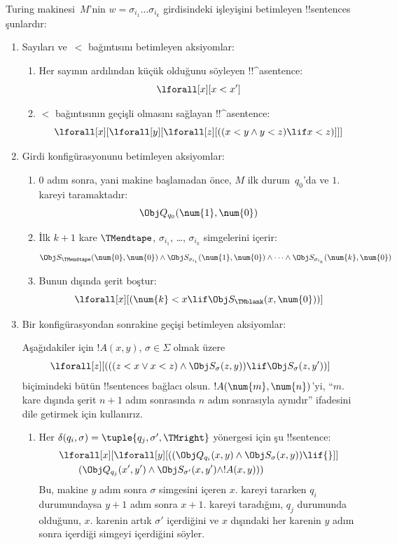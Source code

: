 \documentclass[../../../include/open-logic-section]{subfiles}
\begin{document}
Turing makinesi~$M$'nin $w=\sigma_{i_1}\dots\sigma_{i_k}$ girdisindeki
işleyişini betimleyen !!{sentence}s şunlardır:
\begin{enumerate}
\item Sayıları ve~$<$ bağıntısını betimleyen aksiyomlar:
\begin{enumerate}
\item Her sayının ardılından küçük olduğunu söyleyen !!^a{sentence}:
\[
\lforall[x][x < x']
\]
\item $<$ bağıntısının geçişli olmasını sağlayan !!^a{sentence}:
\[
\lforall[x][\lforall[y][\lforall[z][
      ((x < y \land y < z) \lif x < z)]]]
\]
\end{enumerate}
\item Girdi konfigürasyonunu betimleyen aksiyomlar:
\begin{enumerate}
\item $0$ adım sonra, yani makine başlamadan önce, $M$ ilk durum~$q_0$'da ve
  $1$. kareyi taramaktadır:
\[
\Obj Q_{q_0}(\num{1}, \num{0})
\]
\item İlk $k+1$ kare $\TMendtape$, $\sigma_{i_1}$, \dots,
  $\sigma_{i_k}$ simgelerini içerir:
\[
\Obj S_\TMendtape(\num{0}, \num{0}) \land
\Obj S_{\sigma_{i_1}}(\num{1}, \num{0}) \land
\dots \land
\Obj S_{\sigma_{i_k}}(\num{k}, \num{0})
\]
\item Bunun dışında şerit boştur:
\[
\lforall[x][(\num{k} < x \lif \Obj S_\TMblank(x, \num{0}))]
\]
\end{enumerate}
\item Bir konfigürasyondan sonrakine geçişi betimleyen aksiyomlar:

Aşağıdakiler için $!A(x,y)$, $\sigma\in\Sigma$ olmak üzere
\[
\lforall[z][
  (((z < x \lor x < z) \land \Obj S_\sigma(z, y))
  \lif \Obj S_\sigma(z, y'))]
\]
biçimindeki bütün !!{sentence}s bağlacı olsun. $!A(\num{m},\num{n})$'yi,
``$m$. kare dışında şerit $n+1$ adım sonrasında $n$ adım sonrasıyla aynıdır''
ifadesini dile getirmek için kullanırız.
\begin{enumerate}
\item {} Her
$\delta(q_i,\sigma)=\tuple{q_j,\sigma',\TMright}$ yönergesi için şu
!!{sentence}:
\begin{align*}
& \lforall[x][\lforall[y][(
   (\Obj Q_{q_i}(x, y) \land \Obj S_{\sigma}(x, y)) \lif {}]] \\
&\qquad   (\Obj Q_{q_j}(x', y') \land \Obj S_{\sigma'}(x, y') \land
!A(x, y)))
\end{align*}
Bu, makine $y$ adım sonra $\sigma$ simgesini içeren $x$. kareyi tararken
$q_i$ durumundaysa $y+1$ adım sonra $x+1$. kareyi taradığını, $q_j$ durumunda
olduğunu, $x$. karenin artık $\sigma'$ içerdiğini ve $x$ dışındaki her
karenin $y$ adım sonra içerdiği simgeyi içerdiğini söyler.


\end{enumerate}
\end{enumerate}
\end{document}
